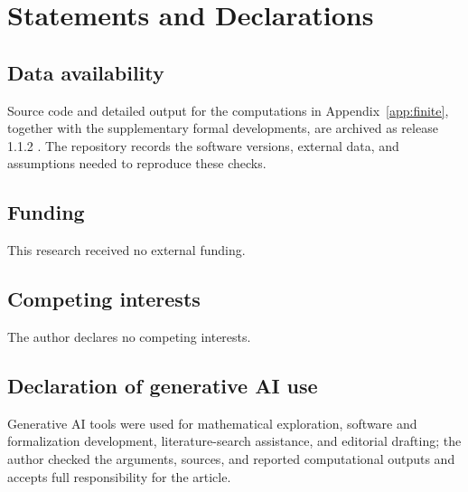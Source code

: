 \documentclass[11pt]{amsart}
\theoremstyle{definition}
\theoremstyle{remark}
\begin{document}
\section*{Statements and Declarations}

\subsection*{Data availability}
Source code and detailed output for the computations in
Appendix~\ref{app:finite}, together with the supplementary formal developments,
are archived as release 1.1.2 \cite{Repo}. The repository records the software
versions, external data, and assumptions needed to reproduce these checks.

\subsection*{Funding}
This research received no external funding.

\subsection*{Competing interests}
The author declares no competing interests.

\subsection*{Declaration of generative AI use}
Generative AI tools were used for mathematical exploration, software and
formalization development, literature-search assistance, and editorial
drafting; the author checked the arguments, sources, and reported
computational outputs and accepts full responsibility for the article.
\end{document}
